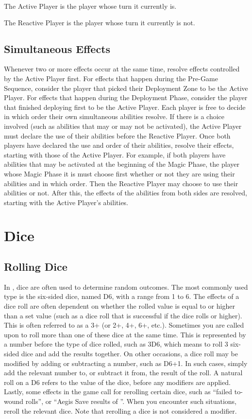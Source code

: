 The Active Player is the player whose turn it currently is.

The Reactive Player is the player whose turn it currently is not.

\subsection{Simultaneous Effects}
\label{simultaneous_effects}

Whenever two or more effects occur at the same time, resolve effects controlled by the Active Player first. For effects that happen during the Pre-Game Sequence, consider the player that picked their Deployment Zone to be the Active Player. For effects that happen during the Deployment Phase, consider the player that finished deploying first to be the Active Player. Each player is free to decide in which order their own simultaneous abilities resolve. If there is a choice involved (such as abilities that may or may not be activated), the Active Player must declare the use of their abilities before the Reactive Player. Once both players have declared the use and order of their abilities, resolve their effects, starting with those of the Active Player. For example, if both players have abilities that may be activated at the beginning of the Magic Phase, the player whose Magic Phase it is must choose first whether or not they are using their abilities and in which order. Then the Reactive Player may choose to use their abilities or not. After this, the effects of the abilities from both sides are resolved, starting with the Active Player's abilities.

\section{Dice}
\label{dice}

\subsection{Rolling Dice}
\label{rolling_dice}

In \nameofthegame{}, dice are often used to determine random outcomes. The most commonly used type is the six-sided dice, named D6, with a range from 1 to 6. The effects of a dice roll are often dependent on whether the rolled value is equal to or higher than a set value (such as a dice roll that is successful if the dice rolls  or higher). This is often referred to as a 3+ (or 2+, 4+, 6+, etc.). Sometimes you are called upon to roll more than one of these dice at the same time. This is represented by a number before the type of dice rolled, such as 3D6, which means to roll 3 six-sided dice and add the results together. On other occasions, a dice roll may be modified by adding or subtracting a number, such as D6+1. In such cases, simply add the relevant number to, or subtract it from, the result of the roll. A natural roll on a D6 refers to the value of the dice, before any modifiers are applied. Lastly, some effects in the game call for rerolling certain dice, such as \enquote{failed to-wound rolls}, or \enquote{Aegis Save results of }. When you encounter such situations, reroll the relevant dice. Note that rerolling a dice is not considered a modifier.

